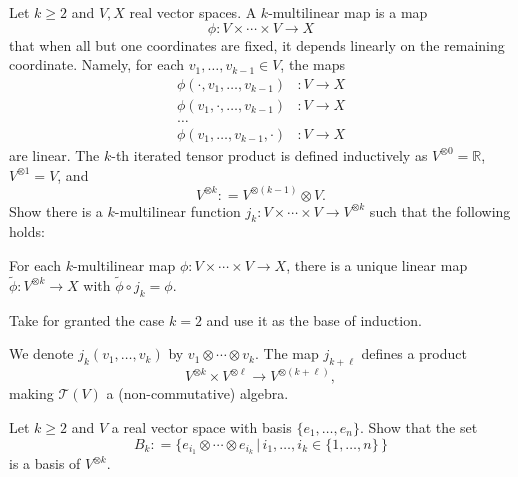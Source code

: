 \documentclass{ximera}
\begin{document}
\begin{exercise}
     Let $k \geq 2$ and $V, X$  real vector spaces. A $k$-multilinear map is a map 
    \[ \phi : V \times \cdots \times V \to X \] 
    that when all but one coordinates are fixed, it depends linearly on the remaining coordinate. Namely, for each $v_1, \ldots , v_{k-1} \in V$, the maps 
    \begin{align*}
        \phi ( \cdot , v_1, \ldots , v_{k-1}) & : V \to X \\
        \phi ( v_1,  \cdot , \ldots , v_{k-1}) & : V \to X \\
        \ldots & \\
        \phi (  v_1, \ldots , v_{k-1}, \cdot ) & : V \to X  
    \end{align*}
     are linear.  The $k$-th iterated tensor product is defined inductively  as $V^{\otimes 0} = \mathbb{R}$,  $V^{\otimes 1} = V$, and
    \[    V^{\otimes k} : =  V^{\otimes (k-1)}   \otimes V .                     \]
    Show there is a $k$-multilinear function $j_k : V\times \cdots \times V \to V^{\otimes k}$ such that the following holds:
    \begin{center}
        For each $k$-multilinear map $\phi : V \times \cdots \times V \to X$, there is a unique linear map $\tilde{\phi} : V ^{\otimes k} \to X$ with $ \tilde{\phi} \circ j _k = \phi $. 
    \end{center}

\begin{hint}
          Take for granted the case $k = 2$ and use it as the base of induction.  

\end{hint}


\end{exercise}
    

    We denote $j_k (v_1, \ldots , v_k) $ by $v_1 \otimes \cdots \otimes v_k$. The map $j_{k + \ell } $ defines a product 
    \[ V^{\otimes k} \times V^{\otimes \ell} \to V^{\otimes (k + \ell )} , \]
    making $\mathcal{T}(V)$ a (non-commutative) algebra. 


    \begin{exercise}
        Let $k \geq 2$ and $V$  a real vector space with basis $\{ e_1, \ldots , e_n \}$. Show that the set 
    \[    B_k : = \{ e_{i_1} \otimes \cdots \otimes e_{i_k} \, \vert \, i_1, \ldots , i_k \in \{ 1, \ldots , n \} \,\}                          \]
    is a basis of $V ^{ \otimes k }$. 

    \end{exercise}
    
\end{document}
